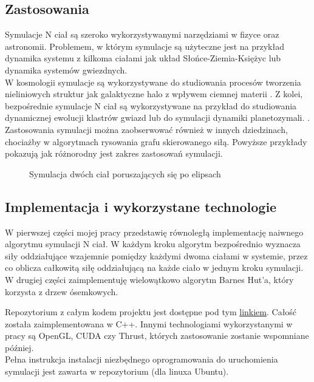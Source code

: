 \documentclass[14pt,twoside,a4paper]{article}
\theoremstyle{definition}
\begin{document}
\subsection{\Large Zastosowania}
Symulacje N ciał są szeroko wykorzystywanymi narzędziami w fizyce oraz astronomii. Problemem, w którym symulacje są użyteczne jest na przykład dynamika systemu z kilkoma ciałami jak układ Słońce-Ziemia-Księżyc \cite{SEMmisc} lub dynamika systemów gwiezdnych. \cite{chaosMisc}\\
W kosmologii symulacje są wykorzystywane do studiowania procesów tworzenia nieliniowych struktur jak galaktyczne halo z wpływem ciemnej materii \cite{haloDensity}. 
Z kolei, bezpośrednie symulacje N ciał są wykorzystywane na przykład do studiowania dynamicznej ewolucji klastrów gwiazd lub do symulacji dynamiki planetozymali. \cite{dirNBody}. Zastosowania symulacji można zaobserwować również w innych dziedzinach, chociażby w algorytmach rysowania grafu skierowanego siłą. \cite{visGraph} Powyższe przykłady pokazują jak różnorodny jest zakres zastosowań symulacji.

\begin{figure}
    \centering
    \def\svgwidth{\columnwidth}
    
    \caption{Symulacja dwóch ciał poruszających się po elipsach}
    \label{fig:kulki}
\end{figure}


\subsection{\Large Implementacja i wykorzystane technologie}
W pierwszej części mojej pracy przedstawię równoległą implementację naiwnego algorytmu symulacji N ciał. W każdym kroku algorytm bezpośrednio wyznacza siły oddziałujące wzajemnie pomiędzy każdymi dwoma ciałami w systemie, przez co oblicza całkowitą siłę oddziałującą na każde ciało w jednym kroku symulacji. W drugiej części zaimplementuję wielowątkowo algorytm Barnes Hut'a, który korzysta z drzew ósemkowych.

Repozytorium z całym kodem projektu jest dostępne pod tym \href{https://github.com/damian1996/N-Body-Simulation}{linkiem}.
Całość została zaimplementowana w C++. Innymi technologiami wykorzystanymi w pracy są OpenGL, CUDA czy Thrust, których zastosowanie zostanie wspomniane później. \\
Pełna instrukcja instalacji niezbędnego oprogramowania do uruchomienia symulacji jest zawarta w repozytorium (dla linuxa Ubuntu).
\end{document}
